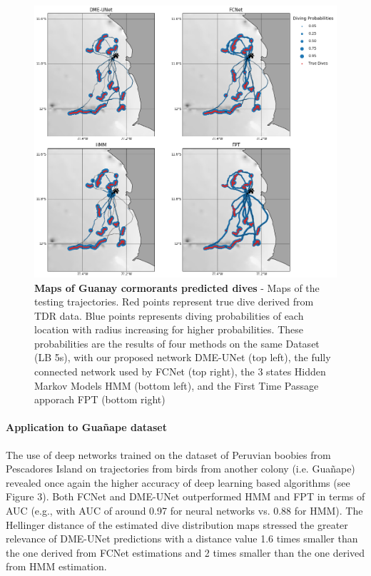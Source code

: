 \documentclass{article}
\begin{document}
\begin{figure}[!h]
  \centering
  \includegraphics[scale=0.5]{figure4b.png}
  \caption{\textbf{Maps of Guanay cormorants predicted dives} - Maps of the testing trajectories. Red points represent true dive derived from TDR data. Blue points represents diving probabilities of each location with radius increasing for higher probabilities. These probabilities are the results of four methods on the same Dataset (LB 5s), with our proposed network DME-UNet (top left), the fully connected network used by \cite{browning_predicting_2018}  FCNet (top right), the 3 states Hidden Markov Models HMM (bottom left), and the First Time Passage apporach FPT (bottom right)}
  \label{figure4b}
\end{figure}

\newpage

\paragraph{Application to Gua\~nape dataset}
The use of deep networks trained on the dataset of Peruvian boobies from Pescadores Island on trajectories from birds from another colony (i.e. Gua\~nape) revealed once again the higher accuracy of deep learning based algorithms (see Figure 3). Both FCNet and DME-UNet outperformed HMM and FPT in terms of AUC (e.g., with AUC of around 0.97 for neural networks vs. 0.88 for HMM). The Hellinger distance of the estimated dive distribution maps stressed the greater relevance of DME-UNet predictions with a distance value 1.6 times smaller than the one derived from FCNet estimations and 2 times smaller than the one derived from HMM estimation.
\end{document}

